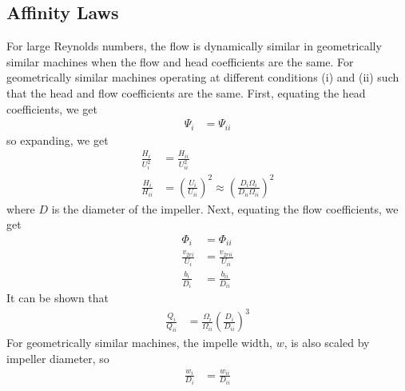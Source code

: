 \subsection{Affinity Laws}
For large Reynolds numbers, the flow is dynamically similar in geometrically similar machines when the flow and head coefficients are the same. For geometrically similar machines operating at different conditions (i) and (ii) such that the head and flow coefficients are the same. First, equating the head coefficients, we get
\begin{align*}
    \Psi_i &= \Psi_{ii}  
\end{align*}
so expanding, we get
\begin{align}
    \frac{H_i}{U_i^2} &= \frac{H_{ii}}{U_{ii}^2} \nonumber \\
    \frac{H_i}{H_{ii}} &= \left(\frac{U_i}{U_{ii}}\right)^2 \approx \left(\frac{D_i \Omega_i}{D_{ii} \Omega_{ii}}\right)^2 \label{eq:affinity1}
\end{align}
where $D$ is the diameter of the impeller. Next, equating the flow coefficients, we get
\begin{align}
    \Phi_i &= \Phi_{ii}  \nonumber \\
    \frac{v_{2ri}}{U_i} &= \frac{v_{2rii}}{U_{ii}} \label{eq:affinity2} \\
    \frac{b_i}{D_i} &= \frac{b_{ii}}{D_{ii}} \label{eq:affinity_geometrical_similarity}
\end{align}
It can be shown that
\begin{align}
    \frac{Q_i}{Q_{ii}} &= \frac{\Omega_i}{\Omega_{ii}} \left(\frac{D_{i}}{D_{ii}}\right)^3 \label{eq:affinity_law_for_flow}
\end{align}
For geometrically similar machines, the impelle width, $w$, is also scaled by impeller diameter, so 
\begin{align}
    \frac{w_i}{D_i} &= \frac{w_{ii}}{D_{ii}} \label{eq:affinity_width}
\end{align}

